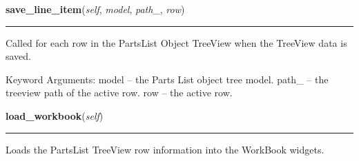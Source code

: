     \vspace{0.5ex}

\hspace{.8\funcindent}\begin{boxedminipage}{\funcwidth}

    \raggedright \textbf{save\_line\_item}(\textit{self}, \textit{model}, \textit{path\_}, \textit{row})

    \vspace{-1.5ex}

    \rule{\textwidth}{0.5\fboxrule}
\setlength{\parskip}{2ex}
    Called for each row in the PartsList Object TreeView when the TreeView 
    data is saved.

    Keyword Arguments: model -- the Parts List object tree model. path\_ --
    the treeview path of the active row. row   -- the active row.

\setlength{\parskip}{1ex}
    \end{boxedminipage}

    \label{reliafree:partlist:PartsListWindow:load_workbook}

    \vspace{0.5ex}

\hspace{.8\funcindent}\begin{boxedminipage}{\funcwidth}

    \raggedright \textbf{load\_workbook}(\textit{self})

    \vspace{-1.5ex}

    \rule{\textwidth}{0.5\fboxrule}
\setlength{\parskip}{2ex}
    Loads the PartsList TreeView row information into the WorkBook widgets.

\setlength{\parskip}{1ex}
    \end{boxedminipage}

    \label{reliafree:partlist:PartsListWindow:filter_parts_list}

    \vspace{0.5ex}

